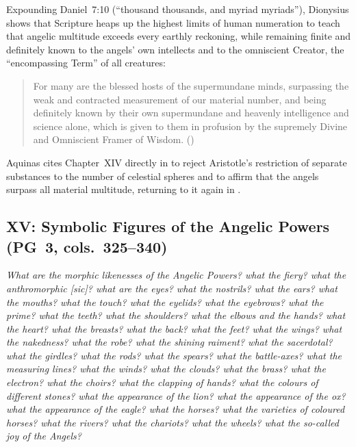 Expounding Daniel~7:10 (``thousand thousands, and myriad myriads''), Dionysius shows that Scripture heaps up the highest limits of human numeration to teach that angelic multitude exceeds every earthly reckoning, while remaining finite and definitely known to the angels' own intellects and to the omniscient Creator, the ``encompassing Term'' of all creatures:
\begin{quotation}
For many are the blessed hosts of the supermundane minds, surpassing the weak and contracted measurement of our material number, and being definitely known by their own supermundane and heavenly intelligence and science alone, which is given to them in profusion by the supremely Divine and Omniscient Framer of Wisdom. ()
\end{quotation}
Aquinas cites Chapter~XIV directly in  to reject Aristotle's restriction of separate substances to the number of celestial spheres and to affirm that the angels surpass all material multitude, returning to it again in .

\subsection{XV: Symbolic Figures of the Angelic Powers (PG~3, cols.~325--340)}
\label{sec:ch-xv}
\emph{What are the morphic likenesses of the Angelic Powers? what the fiery? what the anthromorphic [sic]? what are the eyes? what the nostrils? what the ears? what the mouths? what the touch? what the eyelids? what the eyebrows? what the prime? what the teeth? what the shoulders? what the elbows and the hands? what the heart? what the breasts? what the back? what the feet? what the wings? what the nakedness? what the robe? what the shining raiment? what the sacerdotal? what the girdles? what the rods? what the spears? what the battle-axes? what the measuring lines? what the winds? what the clouds? what the brass? what the electron? what the choirs? what the clapping of hands? what the colours of different stones? what the appearance of the lion? what the appearance of the ox? what the appearance of the eagle? what the horses? what the varieties of coloured horses? what the rivers? what the chariots? what the wheels? what the so-called joy of the Angels?}

